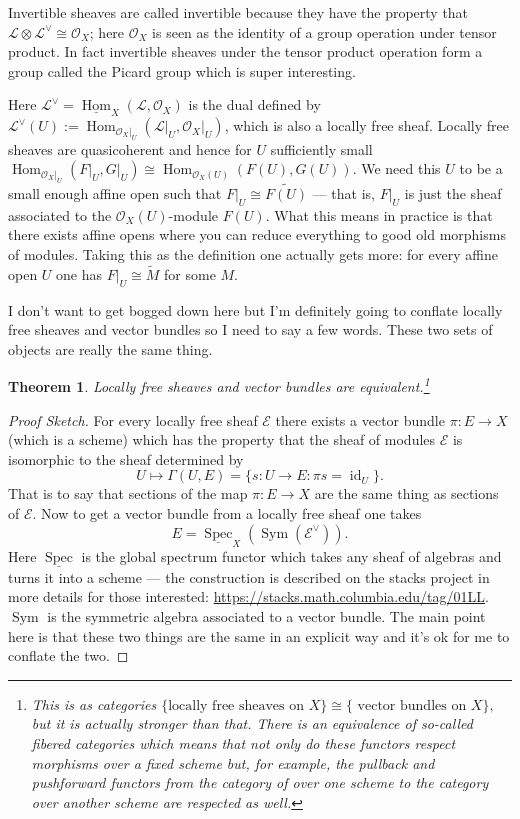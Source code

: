 \documentclass[12pt]{article}
\numberwithin{equation}{section}
\newtheorem{theorem}{Theorem}[subsection]
\theoremstyle{definition}
\theoremstyle{remark}
\newcommand{\id}{\operatorname{id}}
\newcommand{\Hom}{\operatorname{Hom}}
\newcommand{\Ocal}{\mathcal{O}}
\newcommand{\Spec}{\operatorname{Spec}}
\newcommand{\Lcal}{\mathcal{L}}
\newcommand{\Ecal}{\mathcal{E}}
\newcommand{\Sym}{\operatorname{Sym}}
\begin{document}
Invertible sheaves are called invertible because they have the property that $\Lcal \otimes \Lcal^{\vee} \cong \Ocal_X$; here $\Ocal_X$ is seen as the identity of a group operation under tensor product. 
In fact invertible sheaves under the tensor product operation form a group called the Picard group which is super interesting. 	

Here $\Lcal^{\vee} = \underline{\Hom}_X(\Lcal,\Ocal_X)$ is the dual defined by  $\Lcal^{\vee}(U) := \Hom_{\Ocal_X\vert_U}(\Lcal\vert_U, \Ocal_X\vert_U)$, which is also a locally free sheaf.
	Locally free sheaves are quasicoherent and hence for $U$ sufficiently small $\Hom_{\Ocal_X\vert_U}(F\vert_U,G\vert_U) \cong \Hom_{\Ocal_X(U)}(F(U),G(U))$. %
	We need this $U$ to be a small enough affine open such that $F\vert_U \cong \widetilde{F(U)}$ --- that is, $F\vert_U$ is just the sheaf associated to the $\Ocal_X(U)$-module $F(U)$.
	What this means in practice is that there exists affine opens where you can reduce everything to good old morphisms of modules. 
	Taking this as the definition one actually gets more: for every affine open $U$ one has $F\vert_U \cong \widetilde{M}$ for some $M$. 


I don't want to get bogged down here but I'm definitely going to conflate locally free sheaves and vector bundles so I need to say a few words. 
These two sets of objects are really the same thing.

\begin{theorem}
	Locally free sheaves and vector bundles are equivalent.\footnote{This is as categories 
		$\lbrace \mbox{locally free sheaves on $X$} \rbrace \cong \lbrace \mbox{ vector bundles on $X$}\rbrace, $
		but it is actually stronger than that. There is an equivalence of so-called fibered categories which means that not only do these functors respect morphisms over a fixed scheme but, for example, the pullback and pushforward functors from the category of over one scheme to the category over another scheme are respected as well.}
\end{theorem}
\begin{proof}[Proof Sketch]
For every locally free sheaf $\Ecal$ there exists a vector bundle $\pi:E \to X$ (which is a scheme) which has the property that the sheaf of modules $\Ecal$ is isomorphic to the sheaf determined by 
  $$U\mapsto \Gamma(U,E) =\lbrace s:U\to E \colon \pi s = \id_U \rbrace.$$ 
That is to say that sections of the map $\pi: E\to X$ are the same thing as sections of $\Ecal$.
Now to get a vector bundle from a locally free sheaf one takes 
$$E = \underline{\Spec}_X( \Sym(\Ecal^{\vee}) ).$$ 
Here $\underline{\Spec}$ is the global spectrum functor which takes any sheaf of algebras and turns it into a scheme --- the construction is described on the stacks project in more details for those interested: \url{https://stacks.math.columbia.edu/tag/01LL}. $\Sym$ is the symmetric algebra associated to a vector bundle. The main point here is that these two things are the same in an explicit way and it's ok for me to conflate the two.
\end{proof}
\end{document}
